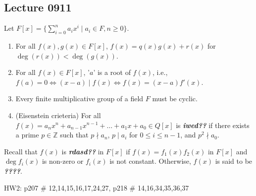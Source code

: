 \documentclass{article}
\begin{document}
\begin{multicols}{2}
\subsection{Lecture 0911}
\begin{mytheorem}
Let $F[x]=\{\sum_{i=0}^{n}a_ix^i\mid a_i\in F,n\geq 0\}$.
\begin{enumerate}[label={(\alph*)}]
\item For all $f(x),g(x)\in F[x]$, $f(x)=q(x)g(x)+r(x)$ for $\deg(r(x))<\deg(g(x))$.
\item For all $f(x)\in F[x]$, '$a$' is a root of $f(x)$, i.e., $f(a)=0\iff (x-a)\mid f(x)\iff f(x)=(x-a)f'(x)$.
\item Every finite multiplicative group of a field $F$ must be cyclic.
\item (Eisenstein crieteria) For all $f(x)=a_nx^n+a_{n-1}x^{n-1}+\dots +a_1x+a_0\in Q[x]$ is \textbf{\emph{iwed??}} if there exists a prime $p\in \mathbb{Z}$ such that $p\nmid a_n$, $p\mid a_i$ for $0\leq i\leq n-1$, and $p^2\nmid a_0$. 
\end{enumerate}
Recall that $f(x)$ is \textbf{\emph{rdasd??}} in $F[x]$ if $f(x)=f_1(x)f_2(x)$ in $F[x]$ and $\deg f_i(x)$ is non-zero or $f_i(x)$ is not constant. Otherwise, $f(x)$ is said to be \textbf{\emph{????}}.
\end{mytheorem}

\begin{notebox}
HW2: p207 \# 12,14,15,16,17,24,27, p218 \# 14,16,34,35,36,37
\end{notebox}


\clearpage
\end{multicols}
\end{document}
